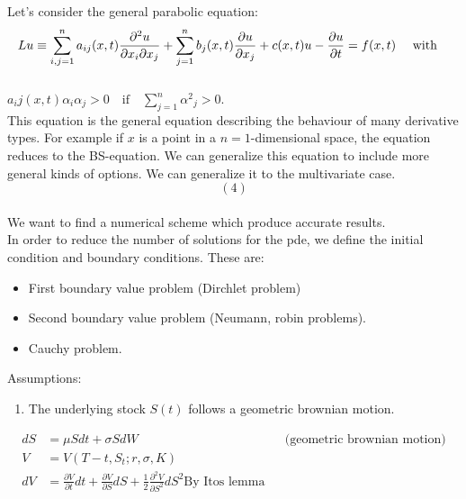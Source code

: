 \documentclass[danish,a4paper,11pt]{article}
\begin{document}
Let's consider the general parabolic equation:
\[Lu \equiv \sum_{i,j=1}^{n} a_{ij} (x,t) \frac{\partial^{2} u}{\partial x_{i}\partial x_{j}} + \sum_{j=1}^{n} b_{j}(x,t) \frac{\partial u}{\partial x_{j}}+c(x,t)u - \frac{\partial u}{\partial t} =f(x,t) \\
\, \quad \,  \text{with} \quad  \]\\
 \(
 a_ij(x,t) \alpha_{i}\alpha_{j} > 0 \quad \text{if} \quad \sum_{j=1}^{n} {\alpha^{2}}_{j} >0.\)\\
 This equation is the general equation describing the behaviour of many derivative types.  For example if \( x \) is a point in a \( n=1 \)-dimensional space, the equation reduces to the BS-equation. We can generalize this equation to include more general kinds of options. We can generalize it to the multivariate case.\\
\[
  (4)
\] \\
We want to find a numerical scheme which produce accurate results. \\
In order to reduce the number of solutions for the pde, we define the initial condition and boundary conditions. These are:
\begin{itemize}
  \item First boundary value problem (Dirchlet problem)
  \item Second boundary value problem (Neumann, robin problems).
  \item Cauchy problem.
\end{itemize}



Assumptions:
\begin{enumerate}
  \item The underlying stock \( S(t) \) follows a geometric brownian motion.
\end{enumerate}
\begin{align*}
  dS  &= \mu S dt  + \sigma S dW && \text{(geometric brownian motion)}  \\
  V & = V(T-t,S_t;r, \sigma, K) \\
  dV    & = \frac{\partial V}{\partial t} dt  + \frac{\partial V}{\partial S} dS  + \frac{1}{2} \frac{\partial^{2} V}{\partial S^{2}} dS^{2} \text{By Itos lemma}
\end{align*}
\end{document}
